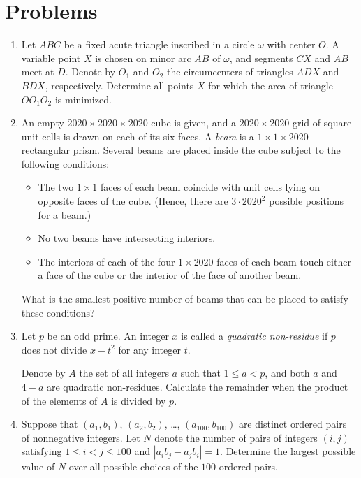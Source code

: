 \documentclass[11pt]{scrartcl}
\begin{document}
\section{Problems}
\begin{enumerate}[\bfseries 1.]
\item %
Let $ABC$ be a fixed acute triangle
inscribed in a circle $\omega$ with center $O$.
A variable point $X$ is chosen on minor arc $AB$ of $\omega$,
and segments $CX$ and $AB$ meet at $D$.
Denote by $O_1$ and $O_2$ the circumcenters of
triangles $ADX$ and $BDX$, respectively.
Determine all points $X$ for which
the area of triangle $OO_1O_2$ is minimized.

\item %
An empty $2020 \times 2020 \times 2020$ cube is given,
and a $2020 \times 2020$ grid of square unit cells is drawn on each of its six faces.
A \emph{beam} is a $1 \times 1 \times 2020$ rectangular prism.
Several beams are placed inside the cube subject to the following conditions:
\begin{itemize}
\item The two $1 \times 1$ faces of each beam coincide
  with unit cells lying on opposite faces of the cube.
  (Hence, there are $3 \cdot 2020^2$ possible positions for a beam.)
\item No two beams have intersecting interiors.
\item The interiors of each of the four $1 \times 2020$ faces of each beam touch
  either a face of the cube or the interior of the face of another beam.
\end{itemize}
What is the smallest positive number of beams that can be placed to satisfy these conditions?

\item %
Let $p$ be an odd prime.
An integer $x$ is called a \emph{quadratic non-residue}
if $p$ does not divide $x-t^2$ for any integer $t$.

Denote by $A$ the set of all integers $a$
such that $1 \le a < p$,
and both $a$ and $4-a$ are quadratic non-residues.
Calculate the remainder
when the product of the elements of $A$ is divided by $p$.

\item %
Suppose that $(a_1, b_1)$, $(a_2, b_2)$, \dots, $(a_{100}, b_{100})$
are distinct ordered pairs of nonnegative integers.
Let $N$ denote the number of pairs of integers $(i,j)$ satisfying
$1 \le i < j \le 100$ and $\left\lvert a_ib_j - a_jb_i \right\rvert = 1$.
Determine the largest possible value of $N$
over all possible choices of the $100$ ordered pairs.


\end{enumerate}
\end{document}
